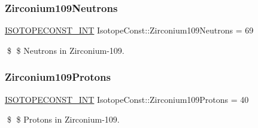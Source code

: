 \subsubsection{\texorpdfstring{Zirconium109\+Neutrons}{Zirconium109Neutrons}}
{\footnotesize\ttfamily \mbox{\hyperlink{group___isotope_const-_macros_ga5f18360b3e99483a35c32d789e62621c}{I\+S\+O\+T\+O\+P\+E\+C\+O\+N\+S\+T\+\_\+\+I\+NT}} Isotope\+Const\+::\+Zirconium109\+Neutrons = 69}

\$ \$ Neutrons in Zirconium-\/109. \mbox{\label{group___isotope_const-_zirconium-_zr109_gace0221ff2e31d74b228cad745d52ed4c}} 
\subsubsection{\texorpdfstring{Zirconium109\+Protons}{Zirconium109Protons}}
{\footnotesize\ttfamily \mbox{\hyperlink{group___isotope_const-_macros_ga5f18360b3e99483a35c32d789e62621c}{I\+S\+O\+T\+O\+P\+E\+C\+O\+N\+S\+T\+\_\+\+I\+NT}} Isotope\+Const\+::\+Zirconium109\+Protons = 40}

\$ \$ Protons in Zirconium-\/109. 